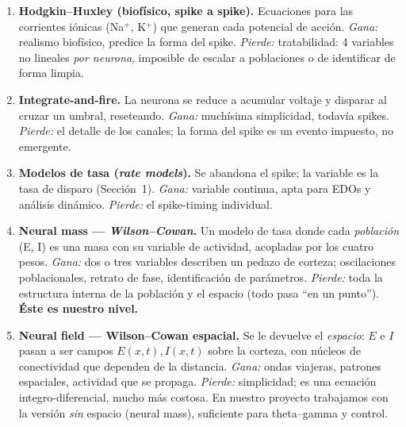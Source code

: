 \documentclass[11pt,a4paper]{article}
\begin{document}
\begin{enumerate}[leftmargin=1.6em,itemsep=3pt]
  \item \textbf{Hodgkin--Huxley (biofísico, spike a spike).} Ecuaciones para las corrientes iónicas (Na$^+$, K$^+$) que generan cada potencial de acción. \emph{Gana:} realismo biofísico, predice la forma del spike. \emph{Pierde:} tratabilidad: 4 variables no lineales \emph{por neurona}, imposible de escalar a poblaciones o de identificar de forma limpia.
  \item \textbf{Integrate-and-fire.} La neurona se reduce a acumular voltaje y disparar al cruzar un umbral, reseteando. \emph{Gana:} muchísima simplicidad, todavía spikes. \emph{Pierde:} el detalle de los canales; la forma del spike es un evento impuesto, no emergente.
  \item \textbf{Modelos de tasa (\emph{rate models}).} Se abandona el spike; la variable es la tasa de disparo (Sección~1). \emph{Gana:} variable continua, apta para EDOs y análisis dinámico. \emph{Pierde:} el spike-timing individual.
  \item \textbf{Neural mass --- \emph{Wilson--Cowan}.} Un modelo de tasa donde cada \emph{población} (E, I) es una masa con su variable de actividad, acopladas por los cuatro pesos. \emph{Gana:} dos o tres variables describen un pedazo de corteza; oscilaciones poblacionales, retrato de fase, identificación de parámetros. \emph{Pierde:} toda la estructura interna de la población y el espacio (todo pasa ``en un punto''). \textbf{Éste es nuestro nivel.}
  \item \textbf{Neural field --- Wilson--Cowan espacial.} Se le devuelve el \emph{espacio}: $E$ e $I$ pasan a ser campos $E(x,t),I(x,t)$ sobre la corteza, con núcleos de conectividad que dependen de la distancia. \emph{Gana:} ondas viajeras, patrones espaciales, actividad que se propaga. \emph{Pierde:} simplicidad; es una ecuación integro-diferencial, mucho más costosa. En nuestro proyecto trabajamos con la versión \emph{sin} espacio (neural mass), suficiente para theta--gamma y control.
\end{enumerate}
\end{document}
